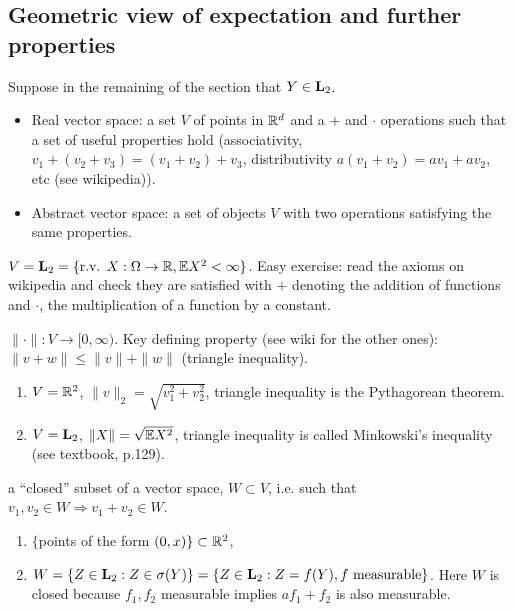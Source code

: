 \documentclass{article}
\begin{document}
\subsection{Geometric view of expectation and further properties}

Suppose in the remaining of the section that $Y \in \mathbf L_2$. 

\begin{itemize}
  \item Real vector space: a set $V$ of points in ${\mathbb R}^d$ and a $+$ and $\cdot$ operations such that a set of useful properties hold (associativity, $v_1 + (v_2 + v_3) = (v_1 + v_2) + v_3$, distributivity $a(v_1 + v_2) = a v_1 + a v_2$, etc (see wikipedia)).
  \item Abstract vector space: a set of objects $V$ with two operations satisfying the same properties.
\end{itemize}

 $V = \mathbf L_2 = \{\text{r.v. }X: \Omega \to {\mathbb R}, {\mathbb E} X^2 < \infty\}$. Easy exercise: read the axioms on wikipedia and check they are satisfied with $+$ denoting the addition of functions and $\cdot$, the multiplication of a function by a constant.


 $\|\cdot\| : V \to [0, \infty)$. Key defining property (see wiki for the other ones): $\|v + w\| \le \|v\| + \|w\|$ (triangle inequality).

\begin{enumerate}
  \item $V = {\mathbb R}^2$, $\|v\|_2 = \sqrt{v_1^2 + v_2^2}$, triangle inequality is the Pythagorean theorem.
  \item $V = \mathbf L_2$, $\|X\| = \sqrt{{\mathbb E} X^2 }$, triangle inequality is called Minkowski's inequality (see textbook, p.129).
\end{enumerate}

 a ``closed'' subset of a vector space, $W \subset V$, i.e. such that $v_1, v_2 \in W \Rightarrow v_1 + v_2 \in W$. 

\begin{enumerate}
  \item $\{$points of the form $(0, x)\} \subset {\mathbb R}^2$,
  \item $W = \{Z \in \mathbf L_2 : Z \in \sigma(Y)\} = \{Z \in \mathbf L_2 : Z = f(Y), f\text{ measurable}\}$. Here $W$ is closed because $f_1, f_2$ measurable implies $a f_1 + f_2$ is also measurable.
\end{enumerate}
\end{document}
